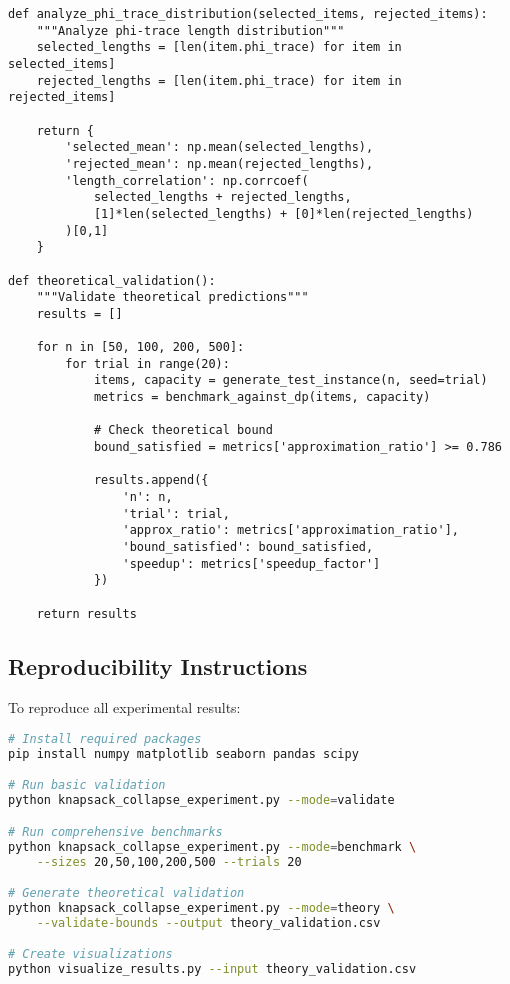 \documentclass[11pt]{article}
\theoremstyle{remark}
\theoremstyle{definition}
\begin{document}
\begin{lstlisting}[caption=Analysis and Visualization]
def analyze_phi_trace_distribution(selected_items, rejected_items):
    """Analyze phi-trace length distribution"""
    selected_lengths = [len(item.phi_trace) for item in selected_items]
    rejected_lengths = [len(item.phi_trace) for item in rejected_items]
    
    return {
        'selected_mean': np.mean(selected_lengths),
        'rejected_mean': np.mean(rejected_lengths),
        'length_correlation': np.corrcoef(
            selected_lengths + rejected_lengths,
            [1]*len(selected_lengths) + [0]*len(rejected_lengths)
        )[0,1]
    }

def theoretical_validation():
    """Validate theoretical predictions"""
    results = []
    
    for n in [50, 100, 200, 500]:
        for trial in range(20):
            items, capacity = generate_test_instance(n, seed=trial)
            metrics = benchmark_against_dp(items, capacity)
            
            # Check theoretical bound
            bound_satisfied = metrics['approximation_ratio'] >= 0.786
            
            results.append({
                'n': n,
                'trial': trial,
                'approx_ratio': metrics['approximation_ratio'],
                'bound_satisfied': bound_satisfied,
                'speedup': metrics['speedup_factor']
            })
    
    return results
\end{lstlisting}

\subsection{Reproducibility Instructions}

To reproduce all experimental results:

\begin{lstlisting}[language=bash, caption=Complete Reproduction Pipeline]
# Install required packages
pip install numpy matplotlib seaborn pandas scipy

# Run basic validation
python knapsack_collapse_experiment.py --mode=validate

# Run comprehensive benchmarks
python knapsack_collapse_experiment.py --mode=benchmark \
    --sizes 20,50,100,200,500 --trials 20

# Generate theoretical validation
python knapsack_collapse_experiment.py --mode=theory \
    --validate-bounds --output theory_validation.csv

# Create visualizations
python visualize_results.py --input theory_validation.csv
\end{lstlisting}
\end{document}
